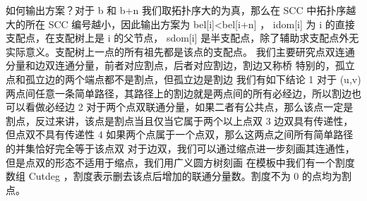 {}如何输出方案？对于\markdownRendererDollarSign{} b \markdownRendererDollarSign{}和\markdownRendererDollarSign{} b+n \markdownRendererDollarSign{}我们取拓扑序大的为真，那么在\markdownRendererDollarSign{} SCC \markdownRendererDollarSign{}中拓扑序越大的所在\markdownRendererDollarSign{} SCC \markdownRendererDollarSign{}编号越小，因此输出方案为\markdownRendererDollarSign{} bel[i]<bel[i+n] \markdownRendererDollarSign{}，\markdownRendererInterblockSeparator
{}
\markdownRendererSectionEnd \markdownRendererSectionBegin
{}\markdownRendererInterblockSeparator
{}\markdownRendererDollarSign{} idom[i] \markdownRendererDollarSign{}为\markdownRendererDollarSign{} i \markdownRendererDollarSign{}的直接支配点，在支配树上是\markdownRendererDollarSign{} i \markdownRendererDollarSign{}的父节点，\markdownRendererDollarSign{} sdom[i] \markdownRendererDollarSign{}是半支配点，除了辅助求支配点外无实际意义。支配树上一点的所有祖先都是该点的支配点。\markdownRendererInterblockSeparator
{}\markdownRendererInterblockSeparator
{}
\markdownRendererSectionEnd 
\markdownRendererSectionEnd \markdownRendererSectionBegin
{}\markdownRendererInterblockSeparator
{}我们主要研究点双连通分量和边双连通分量，前者对应割点，后者对应割边，割边又称桥\markdownRendererParagraphSeparator
{}特别的，孤立点和孤立边的两个端点都不是割点，但孤立边是割边\markdownRendererParagraphSeparator
{}我们有如下结论\markdownRendererParagraphSeparator
{}\markdownRendererDollarSign{} 1 \markdownRendererDollarSign{}对于\markdownRendererDollarSign{} (u,v) \markdownRendererDollarSign{}两点间任意一条简单路径，其路径上的割边就是两点间的所有必经边，所以割边也可以看做必经边\markdownRendererParagraphSeparator
{}\markdownRendererDollarSign{} 2 \markdownRendererDollarSign{}对于两个点双联通分量，如果二者有公共点，那么该点一定是割点，反过来讲，该点是割点当且仅当它属于两个以上点双\markdownRendererParagraphSeparator
{}\markdownRendererDollarSign{} 3 \markdownRendererDollarSign{}边双具有传递性，但点双不具有传递性\markdownRendererParagraphSeparator
{}\markdownRendererDollarSign{} 4 \markdownRendererDollarSign{}如果两个点属于一个点双，那么这两点之间所有简单路径的并集恰好完全等于该点双\markdownRendererParagraphSeparator
{}对于边双，我们可以通过缩点进一步刻画其连通性，但是点双的形态不适用于缩点，我们用广义圆方树刻画\markdownRendererInterblockSeparator
{}\markdownRendererSectionBegin
{}\markdownRendererInterblockSeparator
{}在模板中我们有一个割度数组\markdownRendererDollarSign{} Cutdeg \markdownRendererDollarSign{}，割度表示删去该点后增加的联通分量数。割度不为\markdownRendererDollarSign{} 0 \markdownRendererDollarSign{}的点均为割点。\markdownRendererInterblockSeparator
